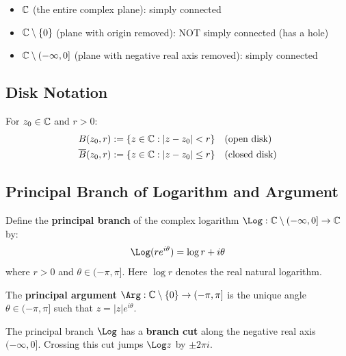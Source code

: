 \begin{example}
\begin{itemize}
\item $\mathbb{C}$ (the entire complex plane): simply connected
\item $\mathbb{C} \setminus \{0\}$ (plane with origin removed): NOT simply connected (has a hole)
\item $\mathbb{C} \setminus (-\infty, 0]$ (plane with negative real axis removed): simply connected
\end{itemize}
\end{example}

\subsection{Disk Notation}

For $z_0 \in \mathbb{C}$ and $r > 0$:
\begin{align}
B(z_0, r) &:= \{z \in \mathbb{C} : |z - z_0| < r\} \quad \text{(open disk)} \\
\overline{B}(z_0, r) &:= \{z \in \mathbb{C} : |z - z_0| \leq r\} \quad \text{(closed disk)}
\end{align}

\subsection{Principal Branch of Logarithm and Argument}

\begin{definition}\label{def:principal-log}
Define the \textbf{principal branch} of the complex logarithm $\Log: \C \setminus (-\infty, 0] \to \C$ by:
\begin{equation}
\Log(r e^{i\theta}) = \log r + i\theta
\end{equation}
where $r > 0$ and $\theta \in (-\pi, \pi]$. Here $\log r$ denotes the real natural logarithm.
\end{definition}

\begin{definition}
The \textbf{principal argument} $\Arg: \C \setminus \{0\} \to (-\pi, \pi]$ is the unique angle $\theta \in (-\pi, \pi]$ such that $z = |z| e^{i\theta}$.
\end{definition}

\begin{remark}
The principal branch $\Log$ has a \textbf{branch cut} along the negative real axis $(-\infty, 0]$. Crossing this cut jumps $\Log z$ by $\pm 2\pi i$.
\end{remark}

